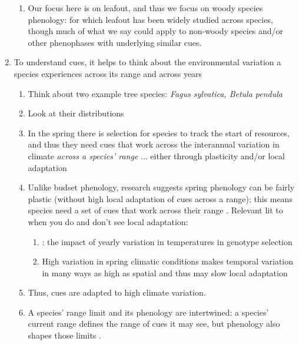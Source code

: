 \documentclass[11pt,letterpaper]{article}
\begin{document}
\begin{enumerate}
\begin{enumerate}
\item Our focus here is on leafout, and thus we focus on woody species phenology: for which leafout has been widely studied across species, though much of what we say could apply to non-woody species and/or other phenophases with underlying similar cues. 
\end{enumerate}
\item To understand cues, it helps to think about the environmental variation a species experiences across its range and across years
\begin{enumerate}
\item Think about two example tree species: \emph{Fagus sylvatica, Betula pendula} 
\item Look at their distributions 
\item In the spring there is selection for species to track the start of resources, and thus they need cues that work across the interannual variation in climate \emph{across a species' range} ... either through plasticity and/or local adaptation
\item Unlike budset phenology, research suggests spring phenology can be fairly plastic (without high local adaptation of cues across a range); this means species need a set of cues that work across their range \citep{liepe2016}. Relevant lit to when you do and don't see local adaptation:
\begin{enumerate}
\item \citet{kelly2003}: the impact of yearly variation in temperatures in genotype selection %
\item High variation in spring climatic conditions makes temporal variation in many ways as high as spatial and thus may slow local adaptation \citep[see also ][]{legave2013}
\end{enumerate}
\item Thus, cues are adapted to high climate variation.
\item A species' range limit and its phenology are intertwined: a species' current range defines the range of cues it may see, but phenology also shapes those limits \citep{morin2007,Morin:2008vp}.

\end{enumerate}
\end{enumerate}
\end{document}
